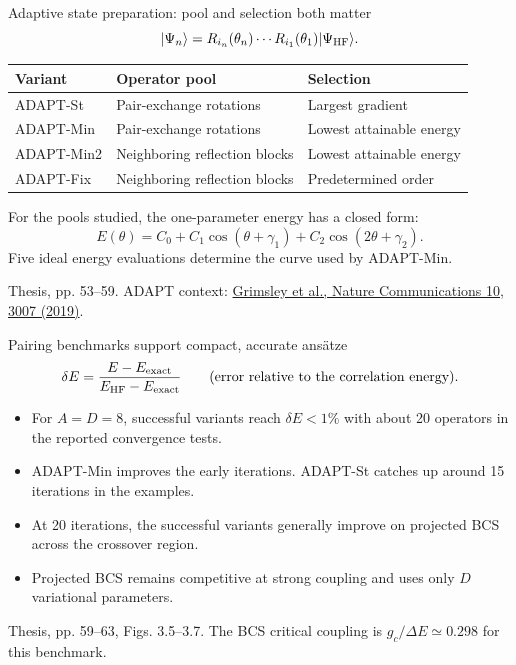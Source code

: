 \documentclass[11pt,aspectratio=169]{beamer}
\newcommand{\ket}[1]{\lvert #1\rangle}
\newcommand{\src}[1]{\par\vfill{\fontsize{7}{8}\selectfont\color{gray}#1\par}}
\begin{document}
\begin{frame}{Adaptive state preparation: pool and selection both matter}
\[
\ket{\Psi_n}=R_{i_n}(\theta_n)\cdots R_{i_1}(\theta_1)\ket{\Psi_{\rm HF}} .
\]
\renewcommand{\arraystretch}{1.23}
\begin{tabular}{@{}lll@{}}
\toprule
\textbf{Variant}&\textbf{Operator pool}&\textbf{Selection}\\\midrule
ADAPT-St&Pair-exchange rotations&Largest gradient\\
ADAPT-Min&Pair-exchange rotations&Lowest attainable energy\\
ADAPT-Min2&Neighboring reflection blocks&Lowest attainable energy\\
ADAPT-Fix&Neighboring reflection blocks&Predetermined order\\\bottomrule
\end{tabular}\par
\medskip
For the pools studied, the one-parameter energy has a closed form:
\[
E(\theta)=C_0+C_1\cos(\theta+\gamma_1)+C_2\cos(2\theta+\gamma_2).
\]
Five ideal energy evaluations determine the curve used by ADAPT-Min.
\src{Thesis, pp. 53--59. ADAPT context: \href{https://doi.org/10.1038/s41467-019-10988-2}{Grimsley et al., Nature Communications 10, 3007 (2019)}.}
\end{frame}

\begin{frame}{Pairing benchmarks support compact, accurate ans\"atze}
\[
\delta E=\frac{E-E_{\rm exact}}{E_{\rm HF}-E_{\rm exact}}
\qquad\text{(error relative to the correlation energy).}
\]
\begin{itemize}\setlength\itemsep{.6em}
\item For $A=D=8$, successful variants reach $\delta E<1\%$ with about 20 operators in the reported convergence tests.
\item ADAPT-Min improves the early iterations. ADAPT-St catches up around 15 iterations in the examples.
\item At 20 iterations, the successful variants generally improve on projected BCS across the crossover region.
\item Projected BCS remains competitive at strong coupling and uses only $D$ variational parameters.
\end{itemize}
\src{Thesis, pp. 59--63, Figs. 3.5--3.7. The BCS critical coupling is $g_c/\Delta E\simeq0.298$ for this benchmark.}
\end{frame}
\end{document}
